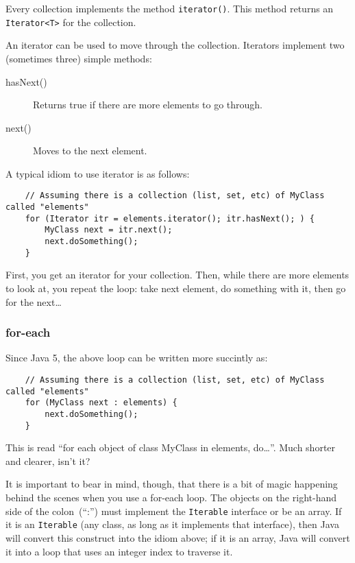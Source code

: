 Every collection implements the method \verb+iterator()+. This method
returns an \verb+Iterator<T>+ for the collection. 

An iterator can be used to move through the collection. Iterators
implement two (sometimes three) simple methods: 

\begin{description}
\item[hasNext()] Returns true if there are more elements to go
  through.
\item[next()] Moves to the next element.
\end{description}

A typical idiom to use iterator is as follows: 

\begin{verbatim}
    // Assuming there is a collection (list, set, etc) of MyClass called "elements"
    for (Iterator itr = elements.iterator(); itr.hasNext(); ) {
        MyClass next = itr.next();
        next.doSomething();
    }
\end{verbatim}

First, you get an iterator for your collection. Then,
while there are more elements to look at,
you repeat the loop: take next element, do something with it, then go
for the next\ldots

\subsubsection{for-each}
\label{sec:each}

Since Java 5, the above loop can be written more succintly as: 

\begin{verbatim}
    // Assuming there is a collection (list, set, etc) of MyClass called "elements"
    for (MyClass next : elements) {
        next.doSomething();
    }    
\end{verbatim}

This is read ``for each object of class MyClass in elements,
do\ldots''. Much shorter and clearer, isn't it? 

It is important to bear in mind, though,
that there is a bit of magic happening behind the scenes when you use
a for-each loop. The objects on the right-hand side of the
colon~(``:'') must implement the \verb+Iterable+ interface or be an
array. If it is an \verb+Iterable+ (any class, as long as it
implements that interface), then Java will convert this construct into
the idiom above; if it is an array, Java will convert it into a loop
that uses an integer index to traverse it. 



